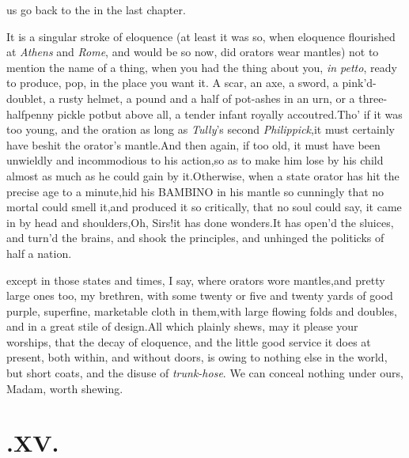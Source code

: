 \documentclass{article}
\begin{document}
 us go back to the
\astvi\break\tsh in the last chapter.

It is a singular stroke of eloquence (at least it was so, when
eloquence flourished at \textit{Athens} and \textit{Rome}, and would be
so now, did orators wear mantles) not to mention the name of a
thing, when you had the thing about you, \textit{in petto}, ready to
produce, pop, in the place you want it. A scar, an axe, a sword, a
pink’d-\break doublet, a rusty helmet, a pound and a half of
pot-ashes in an urn, or a three-halfpenny pickle pot\tsk but
above all, a tender infant royally accoutred.\tsk Tho’ if
it was too young, and the oration as long as \textit{Tully}’s
second \textit{Philippick},\tsk it must certainly have beshit the
orator’s
mantle.\tsk And then again, if too old,\break
\tsk it must have been unwieldly and in\-commodious to his action,\tsk so as
to make him lose by his child almost as much as he could
gain by it.\tsk Otherwise, when a state orator has hit the
precise age to a minute,\tsh hid his BAMBINO in his mantle
so cunningly that no mortal could smell it,\tsk and produced
it so critically, that no soul could say, it came in by head
and shoulders,\tsk Oh, Sirs!\@ it has done wonders.\tsh It
has open’d the sluices, and turn’d the brains, and shook the
principles, and unhinged the politicks of half a
nation.

 except in those states
and times, I say, where orators wore mantles,\tsk and pretty
large ones too, my brethren, with some twenty or five and twenty
yards of good purple, superfine, marketable cloth in\break
them,\tsh with large flowing folds and doubles, and in a
great stile of design.\break\tsh All which plainly shews,
may it please your worships, that the decay of eloquence,
and the little good service it does at present, both within,
and without doors, is owing to nothing else in the world,
but short coats, and the disuse of \textit{trunk-hose}.\tsh
We can conceal nothing under ours, Madam, worth shewing.

\baselineskip 

\section{.\quad  XV.}

\baselineskip 
\end{document}
